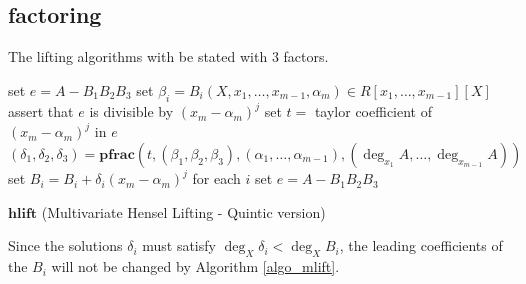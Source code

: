 \documentclass[11pt,reqno]{amsart}
\numberwithin{equation}{section}
\newcommand{\op}[1]  { \operatorname{ #1 }}
\begin{document}
\subsection{factoring}

The lifting algorithms with be stated with $3$ factors.


\begin{algorithm}[H]
\DontPrintSemicolon
{}

set $e = A - B_1 B_2 B_3$ 
set $\beta_i = B_i(X, x_1, \dots, x_{m-1}, \alpha_m) \in R[x_1, \dots, x_{m-1}][X]$\;
\For{$j=1$ \KwTo $\op{deg}_{x_m}(A)$}
{
	assert that $e$ is divisible by $(x_m - \alpha_m)^j$\;
	set $t =$ taylor coefficient of $(x_m - \alpha_m)^j$ in $e$ 
	$(\delta_1, \delta_2, \delta_3) = \textbf{pfrac}(t, (\beta_1, \beta_2, \beta_3),(\alpha_1, \dots,\alpha_{m-1}), (\op{deg}_{x_1}A, \dots, \op{deg}_{x_{m-1}}A))$ \;
	set $B_i = B_i + \delta_i (x_m - \alpha_m)^j$ for each $i$\;
	set $e = A - B_1 B_2 B_3$
}
{
}
\caption{$\textbf{hlift}$ (Multivariate Hensel Lifting - Quintic version)}
\label{algo_mlift}
\end{algorithm}

Since the solutions $\delta_i$ must satisfy
$\op{deg}_{X} \delta_i < \op{deg}_{X} B_i$, the leading coefficients of the
$B_i$ will not be changed by Algorithm \ref{algo_mlift}.
\end{document}
